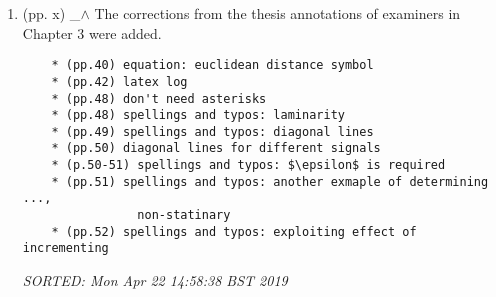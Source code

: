 \documentclass[12pt]{article}
\begin{document}
\begin{enumerate}
	\begin{verbatim}
	%CHAPTER 5
	* Fig 5.5: embedding parameters $\overline{m_0}=6$, $\overline{\tau_0}=10$.
	* Fig 5.6: embedding parameters $\overline{m_0}=6$, $\overline{\tau_0}=10$.
	* Fig 5.7: embedding parameters $\overline{m_0}=6$, $\overline{\tau_0}=10$.
	* Fig 5.8: embedding parameters $\overline{m_0}=6$, $\overline{\tau_0}=10$.
	* 5.5 RP: $\overline{m_0}=6$, $\overline{\tau_0}=6$ and a recurrence 
	* Fig 5.9: embedding parameters $\overline{m_0}=6$, $\overline{\tau_0}=10$ and 
	* Fig 5.10: embedding parameters $\overline{m_0}=6$, $\overline{\tau_0}=10$ and 
	* Fig 5.11: embedding parameters $\overline{m_0}=6$, $\overline{\tau_0}=10$ and 
	* Fig 5.12: embedding parameters $\overline{m_0}=6$, $\overline{\tau_0}=10$ and 	
	* 5.6 RQA: embedding parameters $\overline{m_0}=6$, $\overline{\tau_0}=10$ and 
	* Fig 5.13: embedding parameters $\overline{m_0}=6$, $\overline{\tau_0}=10$ and 
	* Fig 5.14: embedding parameters $\overline{m_0}=6$, $\overline{\tau_0}=10$ and
 	%CHAPTER 6
	* Fig 6.4: embedding parameters $\overline{m_0}=6$, $\overline{\tau_0}=8$ and 
	* Fig 6.5: embedding parameters $\overline{m_0}=6$, $\overline{\tau_0}=8$ and
	* 6.5 RP: ($\overline{m_0}=6$, $\overline{\tau_0}=8$) 
	* Fig 6.6: embedding parameters $\overline{m_0}=6$, $\overline{\tau_0}=8$ and
	* Fig 6.7: embedding parameters $\overline{m_0}=6$, $\overline{\tau_0}=8$ and
	* 6.6 RQA: embedding parameters $\overline{m_0}=6$, $\overline{\tau_0}=8$ and 
	* Fig 6.8: embedding parameters $\overline{m_0}=6$, $\overline{\tau_0}=8$ and
	\end{verbatim}
	\textit{
	SORTED:  \\
	Mon Apr 22 20:45:14 BST 2019 \\
	Mon  6 May 12:01:39 BST 2019 (amend)
	}
	\\






\item  (pp. x)  \_$\wedge$  
	The corrections from the thesis annotations of examiners in Chapter 3
	were added. 
	\begin{verbatim}
	* (pp.40) equation: euclidean distance symbol
	* (pp.42) latex log
	* (pp.48) don't need asterisks 
	* (pp.48) spellings and typos: laminarity
	* (pp.49) spellings and typos: diagonal lines
	* (pp.50) diagonal lines for different signals 
	* (p.50-51) spellings and typos: $\epsilon$ is required
	* (pp.51) spellings and typos: another exmaple of determining ...,
				non-statinary  
	* (pp.52) spellings and typos: exploiting effect of incrementing 
	\end{verbatim}
	\textit{
	SORTED:  Mon Apr 22 14:58:38 BST 2019
	}
	\\






\end{enumerate}
\end{document}
